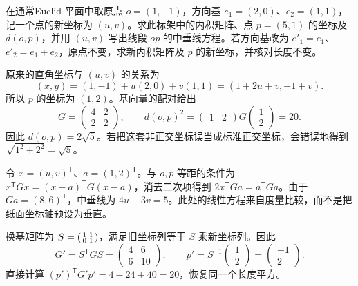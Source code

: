 \begin{exercise}\label{g1:ex:oblique-frame-model}
	在通常Euclid 平面中取原点 \(o=(1,-1)\)，方向基 \(e_1=(2,0)\)、\(e_2=(1,1)\)，记一个点的新坐标为 \((u,v)\)。求此标架中的内积矩阵、点 \(p=(5,1)\) 的坐标及 \(d(o,p)\)，并用 \((u,v)\) 写出线段 \(op\) 的中垂线方程。若方向基改为 \(e'_1=e_1\)、\(e'_2=e_1+e_2\)，原点不变，求新内积矩阵及 \(p\) 的新坐标，并核对长度不变。
\end{exercise}
\begin{solution}
	原来的直角坐标与 \((u,v)\) 的关系为
	\[
		(x,y)=(1,-1)+u(2,0)+v(1,1)=(1+2u+v,-1+v).
	\]
	所以 \(p\) 的坐标为 \((1,2)\)。基向量的配对给出
	\[
		G=\begin{pmatrix}4&2\\2&2\end{pmatrix},\qquad
		d(o,p)^2=\begin{pmatrix}1&2\end{pmatrix}G\begin{pmatrix}1\\2\end{pmatrix}=20.
	\]
	因此 \(d(o,p)=2\sqrt5\)。若把这套非正交坐标误当成标准正交坐标，会错误地得到 \(\sqrt{1^2+2^2}=\sqrt5\)。

	令 \(x=(u,v)^{\mathsf T}\)、\(a=(1,2)^{\mathsf T}\)。与 \(o,p\) 等距的条件为 \(x^{\mathsf T}Gx=(x-a)^{\mathsf T}G(x-a)\)，消去二次项得到 \(2x^{\mathsf T}Ga=a^{\mathsf T}Ga\)。由于 \(Ga=(8,6)^{\mathsf T}\)，中垂线为 \(4u+3v=5\)。此处的线性方程来自度量比较，而不是把纸面坐标轴预设为垂直。

	换基矩阵为 \(S=\begin{psmallmatrix}1&1\\0&1\end{psmallmatrix}\)，满足旧坐标列等于 \(S\) 乘新坐标列。因此
	\[
		G'=S^{\mathsf T}GS=\begin{pmatrix}4&6\\6&10\end{pmatrix},
		\qquad p'=S^{-1}\begin{pmatrix}1\\2\end{pmatrix}=\begin{pmatrix}-1\\2\end{pmatrix}.
	\]
	直接计算 \((p')^{\mathsf T}G'p'=4-24+40=20\)，恢复同一个长度平方。
\end{solution}

